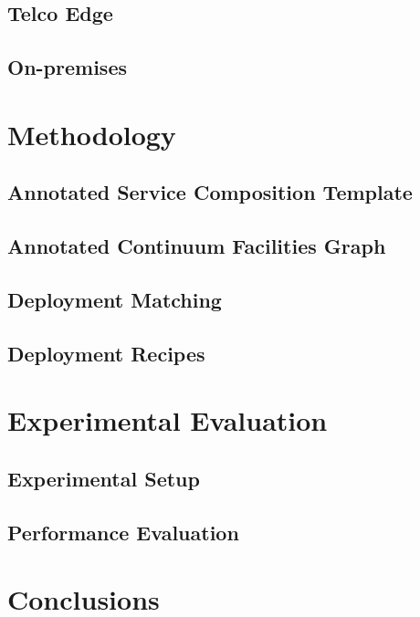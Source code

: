 \subsection{Telco Edge}

\subsection{On-premises}

\section{Methodology}

\subsection{Annotated Service Composition Template}

\subsection{Annotated Continuum Facilities Graph}

\subsection{Deployment Matching}

\subsection{Deployment Recipes}

\section{Experimental Evaluation}

\subsection{Experimental Setup}

\subsection{Performance Evaluation}

\section{Conclusions}

\backmatter

